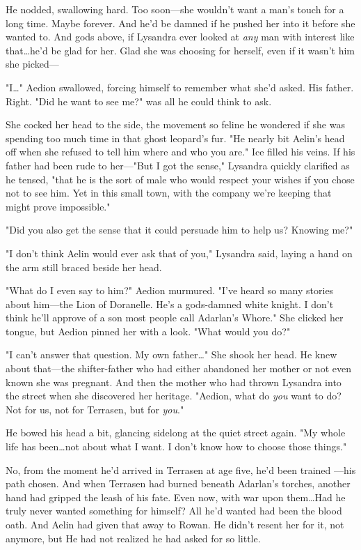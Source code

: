 He nodded, swallowing hard.
Too soon---she wouldn't want a man's touch for a long time.
Maybe forever.
And he'd be damned if he pushed her into it before she wanted to.
And gods above, if Lysandra ever looked at \emph{any} man with interest like that\ldots he'd be glad for her.
Glad she was choosing for herself, even if it wasn't him she picked---

"I\ldots" Aedion swallowed, forcing himself to remember what she'd asked.
His father.
Right.
"Did he want to see me?"
was all he could think to ask.

She cocked her head to the side, the movement so feline he wondered if she was spending too much time in that ghost leopard's fur.
"He nearly bit Aelin's head off when she refused to tell him where and who you are."
Ice filled his veins.
If his father had been rude to her---"But I got the sense," Lysandra quickly clarified as he tensed, "that he is the sort of male who would respect your wishes if you chose not to see him.
Yet in this small town, with the company we're keeping 
that might prove impossible."

"Did you also get the sense that it could persuade him to help us?
Knowing me?"

"I don't think Aelin would ever ask that of you," Lysandra said, laying a hand on the arm still braced beside her head.

"What do I even say to him?"
Aedion murmured.
"I've heard so many stories about him---the Lion of Doranelle.
He's a gods-damned white knight.
I don't think he'll approve of a son most people call Adarlan's Whore."
She clicked her tongue, but Aedion pinned her with a look.
"What would you do?"

"I can't answer that question.
My own father\ldots" She shook her head.
He knew about that---the shifter-father who had either abandoned her mother or not even known she was pregnant.
And then the mother who had thrown Lysandra into the street when she discovered her heritage.
"Aedion, what do \emph{you} want to do?
Not for us, not for Terrasen, but for \emph{you}."

He bowed his head a bit, glancing sidelong at the quiet street again.
"My whole life has been\ldots not about what I want.
I don't know how to choose those things."

No, from the moment he'd arrived in Terrasen at age five, he'd been trained ---his path chosen.
And when Terrasen had burned beneath Adarlan's torches, another hand had gripped the leash of his fate.
Even now, with war upon them\ldots Had he truly never wanted something for himself?
All he'd wanted had been the blood oath.
And Aelin had given that away to Rowan.
He didn't resent her for it, not anymore, but  He had not realized he had asked for so little.

